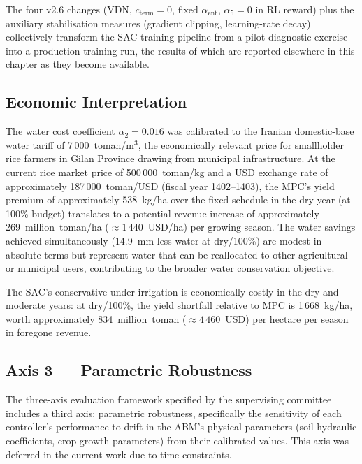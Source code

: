The four v2.6 changes (VDN, $c_{\mathrm{term}} = 0$, fixed $\alpha_{\mathrm{ent}}$,
$\alpha_5 = 0$ in RL reward) plus the auxiliary stabilisation measures (gradient
clipping, learning-rate decay) collectively transform the SAC training pipeline
from a pilot diagnostic exercise into a production training run, the results of
which are reported elsewhere in this chapter as they become available.

\subsection{Economic Interpretation}

The water cost coefficient $\alpha_2 = 0.016$ was calibrated to the Iranian domestic-base
water tariff of 7\,000~toman/m$^3$, the economically relevant price for smallholder rice
farmers in Gilan Province drawing from municipal infrastructure.
At the current rice market price of 500\,000~toman/kg and a USD exchange rate of
approximately 187\,000~toman/USD (fiscal year 1402--1403), the MPC's yield premium of
approximately 538~kg/ha over the fixed schedule in the dry year (at 100\% budget)
translates to a potential revenue increase of approximately 269~million~toman/ha
($\approx 1\,440$~USD/ha) per growing season.
The water savings achieved simultaneously (14.9~mm less water at dry/100\%) are modest
in absolute terms but represent water that can be reallocated to other agricultural
or municipal users, contributing to the broader water conservation objective.

The SAC's conservative under-irrigation is economically costly in the dry and moderate
years: at dry/100\%, the yield shortfall relative to MPC is 1\,668~kg/ha, worth
approximately 834~million~toman ($\approx 4\,460$~USD) per hectare per season in
foregone revenue.

\subsection{Axis 3 — Parametric Robustness}

The three-axis evaluation framework specified by the supervising committee includes a
third axis: parametric robustness, specifically the sensitivity of each controller's
performance to drift in the ABM's physical parameters (soil hydraulic coefficients,
crop growth parameters) from their calibrated values.
This axis was deferred in the current work due to time constraints.

